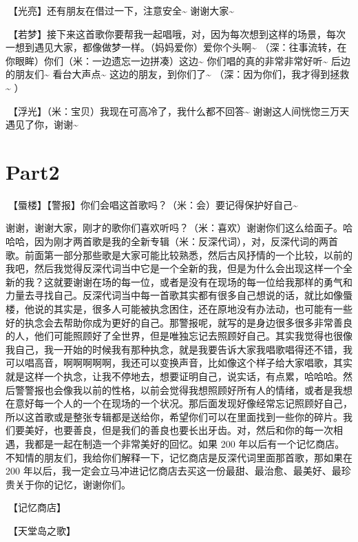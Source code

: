 \documentclass[
]{book}
\begin{document}
🎵【光亮】还有朋友在借过一下，注意安全\textasciitilde{} 谢谢大家\textasciitilde{}

🎵【若梦】接下来这首歌你要帮我一起唱哦，对，因为每次想到这样的场景，每次一想到遇见大家，都像做梦一样。（妈妈爱你）爱你个头啊\textasciitilde{} （深：往事流转，在你眼眸）你们（米：一边遗忘一边拼凑）这边\textasciitilde{} 你们唱的真的非常非常好听\textasciitilde{} 后边的朋友们\textasciitilde{} 看台大声点\textasciitilde{} 这边的朋友，到你们了\textasciitilde{} （深：因为你们，我才得到拯救\textasciitilde{} ）

🎵【浮光】（米：宝贝）我现在可高冷了，我什么都不回答\textasciitilde{} 谢谢这人间恍惚三万天遇见了你，谢谢\textasciitilde{}

\section{Part2}\label{chengdu-20240615-part2}

🎵【蜃楼】【警报】你们会唱这首歌吗？（米：会）要记得保护好自己\textasciitilde{}

谢谢，谢谢大家，刚才的歌你们喜欢听吗？（米：喜欢）谢谢你们这么给面子。哈哈哈，因为刚才两首歌是我的全新专辑（米：反深代词），对，反深代词的两首歌。前面第一部分那些歌是大家可能比较熟悉，然后古风抒情的一个比较，以前的我吧，然后我觉得反深代词当中它是一个全新的我，但是为什么会出现这样一个全新的我？这就要谢谢在场的每一位，或者是没有在现场的每一位给我那样的勇气和力量去寻找自己。反深代词当中每一首歌其实都有很多自己想说的话，就比如像蜃楼，他说的其实是，很多人可能被执念困住，还在原地没有办法动，也可能有一些好的执念会去帮助你成为更好的自己。那警报呢，就写的是身边很多很多非常善良的人，他们可能照顾好了全世界，但是唯独忘记去照顾好自己。其实我觉得也很像我自己，我一开始的时候我有那种执念，就是我要告诉大家我唱歌唱得还不错，我可以唱高音，啊啊啊啊啊，我还可以变换声音，比如像这个样子给大家唱歌，其实就是这样一个执念，让我不停地去，想要证明自己，说实话，有点累，哈哈哈。然后警警报也会像我以前的性格，以前会觉得我想照顾好所有人的情绪，或者是我想在意好每一个人的一个在现场的一个状况。那后面发现好像经常忘记照顾好自己，所以这首歌或是整张专辑都是送给你，希望你们可以在里面找到一些你的碎片。我们要美好，也要善良，但是我们的善良也要长出牙齿。对，然后和你的每一次相遇，我都是一起在制造一个非常美好的回忆。如果 200 年以后有一个记忆商店。不知情的朋友们，我给你们解释一下，记忆商店是反深代词里面那首歌，那如果在 200 年以后，我一定会立马冲进记忆商店去买这一份最甜、最治愈、最美好、最珍贵关于你的记忆，谢谢你们。

🎵【记忆商店】

🎵【天堂岛之歌】
\end{document}
